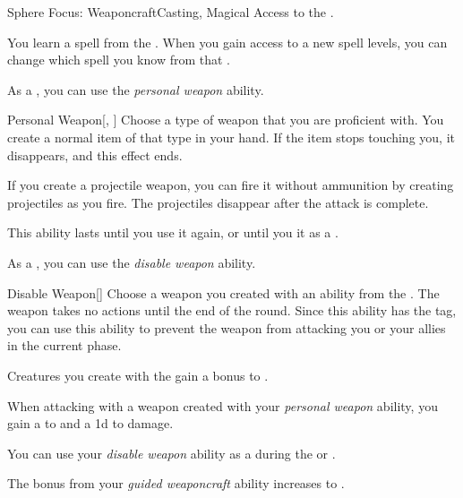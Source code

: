     \begin{feat}{Sphere Focus: Weaponcraft}{Casting, Magical}
        \featpre Access to the  .

         You learn a spell from the  .
        When you gain access to a new spell levels, you can change which spell you know from that .

         As a , you can use the \textit{personal weapon} ability.
        \begin{ability}{Personal Weapon}[, ]
            Choose a type of weapon that you are proficient with.
            You create a normal item of that type in your hand.
            If the item stops touching you, it disappears, and this effect ends.

            If you create a projectile weapon, you can fire it without ammunition by creating projectiles as you fire.
            The projectiles disappear after the attack is complete.

            This ability lasts until you use it again, or until you  it as a .
        \end{ability}

         As a , you can use the \textit{disable weapon} ability.
        \begin{ability}{Disable Weapon}[]
            Choose a weapon you created with an ability from the  .
            The weapon takes no actions until the end of the round.
            Since this ability has the  tag, you can use this ability to prevent the weapon from attacking you or your allies in the current phase.
        \end{ability}

         Creatures you create with the   gain a  bonus to .

         When attacking with a weapon created with your \textit{personal weapon} ability, you gain a   to  and a \plus1d  to damage.

         You can use your \textit{disable weapon} ability as a  during the  or .

         The bonus from your \textit{guided weaponcraft} ability increases to .
    \end{feat}

